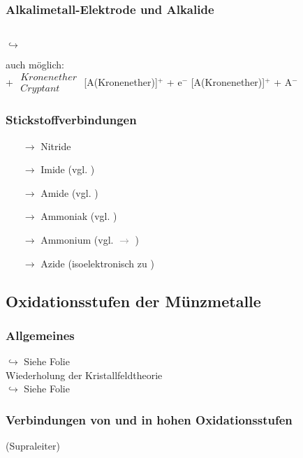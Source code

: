 \documentclass[a4paper, 12pt]{article}
\begin{document}
\subsubsection{Alkalimetall-Elektrode und Alkalide}
\begin{center}
    \\
    $\hookrightarrow$ 
\end{center}
auch möglich:\\
 + $\begin{array}{c}Kronenether\\ Cryptant\end{array}$ \ce{->} [A(Kronenether)]$^+$ + e$^-$ \ce{->[{+A}]} [A(Kronenether)]$^+$ + A$^-$
\subsubsection{Stickstoffverbindungen}
\begin{itemize}
    \item[$\rightarrow$] Nitride 
    \item[$\rightarrow$] Imide  (vgl. )
    \item[$\rightarrow$] Amide  (vgl. )
    \item[$\rightarrow$] Ammoniak  (vgl. )
    \item[$\rightarrow$] Ammonium  (vgl.  \textcolor{gray}{$\rightarrow$ })
    \item[$\rightarrow$] Azide  (isoelektronisch zu )
\end{itemize}

\subsection{Oxidationsstufen der Münzmetalle}
\subsubsection{Allgemeines}
$\hookrightarrow$ Siehe Folie\\
Wiederholung der Kristallfeldtheorie\\
$\hookrightarrow$ Siehe Folie\\

\subsubsection{Verbindungen von  und  in hohen Oxidationsstufen}
 (Supraleiter)\\
\end{document}
